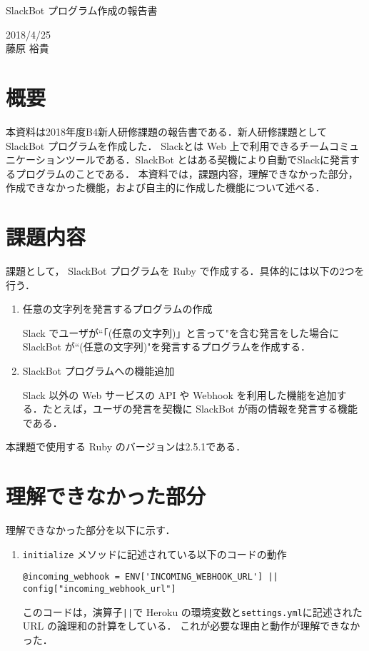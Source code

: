 \documentclass[12pt]{jsarticle}
\begin{document}
\begin{center}
{\LARGE SlackBot プログラム作成の報告書}
\end{center}

\begin{flushright}
  2018/4/25\\
  藤原 裕貴
\end{flushright}
\section{概要}
\label{sec:introduction}
本資料は2018年度B4新人研修課題の報告書である．新人研修課題として SlackBot プログラムを作成した．
Slack\cite{Slack}とは Web 上で利用できるチームコミュニケーションツールである．SlackBot とはある契機により自動でSlackに発言するプログラムのことである．
本資料では，課題内容，理解できなかった部分，作成できなかった機能，および自主的に作成した機能について述べる．


\section{課題内容}
課題として， SlackBot プログラムを Ruby で作成する．具体的には以下の2つを行う．

\begin{enumerate}
\item 任意の文字列を発言するプログラムの作成

Slack でユーザが``「(任意の文字列)」と言って"を含む発言をした場合に SlackBot が``(任意の文字列)"を発言するプログラムを作成する．

\item SlackBot プログラムへの機能追加

Slack 以外の Web サービスの API や Webhook を利用した機能を追加する．たとえば，ユーザの発言を契機に SlackBot が雨の情報を発言する機能である．
\end{enumerate}

本課題で使用する Ruby のバージョンは2.5.1である．

\section{理解できなかった部分}
理解できなかった部分を以下に示す．
\begin{enumerate}
\item \verb|initialize| メソッドに記述されている以下のコードの動作
  \begin{verbatim}
@incoming_webhook = ENV['INCOMING_WEBHOOK_URL'] || config["incoming_webhook_url"]
  \end{verbatim}
    このコードは，演算子\verb+||+で Heroku の環境変数と\verb|settings.yml|に記述された URL の論理和の計算をしている．
    これが必要な理由と動作が理解できなかった．

\end{enumerate}
\end{document}

